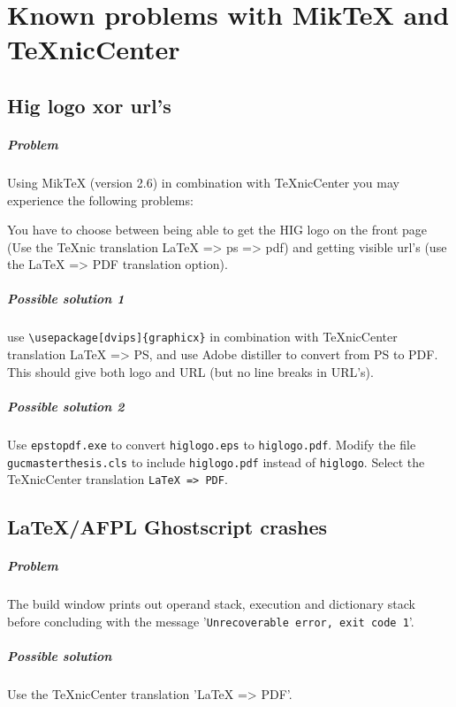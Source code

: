 \documentclass[informationsecurity]{gucmasterproject}
\begin{document}
\appendix
\chapter{Known problems with MikTeX and TeXnicCenter}
\section{Hig logo xor url's}
\paragraph{Problem}
Using MikTeX (version 2.6) in combination with TeXnicCenter you may experience the following problems:

You have to choose between being able to get the HIG logo on the front page (Use the TeXnic translation LaTeX => ps => pdf)  and getting visible url's (use the LaTeX => PDF translation option).

\paragraph{Possible solution 1}
use \verb+\usepackage[dvips]{graphicx}+ in combination with TeXnicCenter translation LaTeX => PS, and use Adobe distiller to convert from PS to PDF.  This should give both logo and URL (but no line breaks in URL's).

\paragraph{Possible solution 2}
Use \verb+epstopdf.exe+ to convert \verb+higlogo.eps+ to \verb+higlogo.pdf+.
Modify the file \verb+gucmasterthesis.cls+ to include \verb+higlogo.pdf+ instead of \verb+higlogo+.
Select the TeXnicCenter translation \verb+LaTeX => PDF+.


\section{\LaTeX/AFPL Ghostscript crashes}
\paragraph{Problem}
The build window prints out operand stack, execution and dictionary stack before concluding with the message 
'\verb+Unrecoverable error, exit code 1+'.
\paragraph{Possible solution}
Use the TeXnicCenter translation 'LaTeX => PDF'.



%


\end{document}
